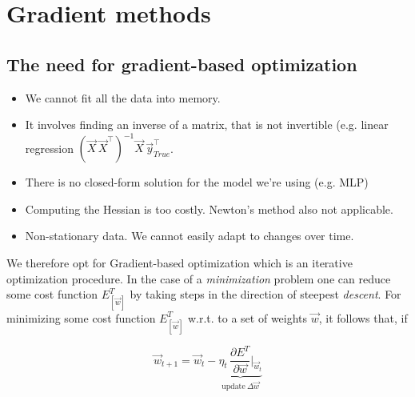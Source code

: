 \section{Gradient methods}

\subsection{The need for gradient-based optimization}

\begin{frame}






\pause
\begin{itemize}
	\item We cannot fit all the data into memory.
	\item It involves finding an inverse of a matrix, that is not invertible (e.g. linear regression $(\vec X \, \vec X^\top)^{-1}\vec X \, \vec y_{True}^\top$.
	\item There is no closed-form solution for the model we're using (e.g. MLP)
	\item Computing the Hessian is too costly. Newton's method also not applicable.
	\item Non-stationary data. We cannot easily adapt to changes over time.
\end{itemize}

\end{frame}

We therefore opt for Gradient-based optimization which is an iterative optimization procedure. 
In the case of a \emph{minimization} problem one can reduce some cost function $E^T_{[\vec w]}$ by taking steps in the direction of steepest \emph{descent}.
For minimizing some cost function $E^T_{[\vec w]}$ w.r.t. to a set of weights $\vec w$, it follows that, if

\begin{equation}
\vec w_{t+1} = \vec w_t - \underbrace{\eta_t \, \frac{\partial E^T}{\partial \vec w} \Bigg|_{\vec w_t}}_{\text{update}~\Delta \vec w}
\end{equation}

